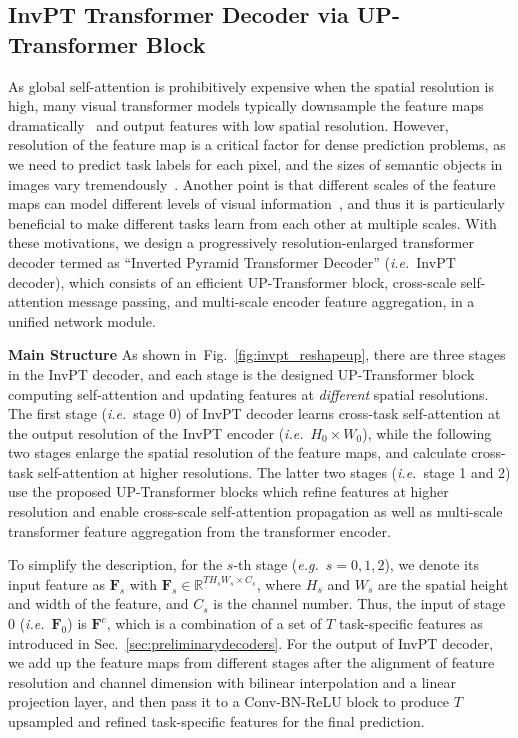 \documentclass[runningheads]{llncs}
\newcommand*{\eg}{\emph{e.g.}}
\newcommand*{\ie}{\emph{i.e.}}
\begin{document}
\subsection{InvPT Transformer Decoder via UP-Transformer Block}
\label{sec:invpt_decoder}
As global self-attention is prohibitively expensive when the spatial resolution is high, many visual transformer models typically downsample the feature maps dramatically~\cite{vit,cvt,pvt} and output features with low spatial resolution. However, resolution of the feature map is a critical factor for dense prediction problems, as we need to predict task labels for each pixel, and the sizes of semantic objects in images vary tremendously~\cite{pspnet}.
Another point is that different scales of the feature maps can model different levels of visual information~\cite{mti,hrformer}, and thus it is particularly beneficial to make different tasks learn from each other at {multiple scales}. With these motivations, we design a progressively resolution-enlarged transformer decoder termed as ``Inverted Pyramid Transformer Decoder'' (\ie~InvPT decoder), which consists of an efficient UP-Transformer block, cross-scale self-attention message passing, and multi-scale encoder feature aggregation, in a unified network module.

\vspace{3pt}
\par\noindent\textbf{Main Structure} As shown in~Fig.~\ref{fig:invpt_reshapeup}, there are three stages in the InvPT decoder, and each stage is the designed UP-Transformer block computing self-attention and updating features at \emph{different} spatial resolutions. The first stage (\ie~stage 0) of InvPT decoder learns cross-task self-attention at the output resolution of the InvPT encoder (\ie~$H_0 \times W_0$), while
the following two stages enlarge the spatial resolution of the feature maps, and calculate cross-task self-attention at higher resolutions.
The latter two stages (\ie~stage 1 and 2) use the proposed UP-Transformer blocks which refine features at higher resolution and enable cross-scale self-attention propagation as well as multi-scale transformer feature aggregation from the transformer encoder.

\par To simplify the description, for the $s$-th stage (\eg~$s=0,1,2$), we denote its input feature as $\mathbf{F}_s$ with $\mathbf{F}_s \in \mathbb{R}^{TH_s W_s  \times C_s }$, where $H_s$ and $W_s$ are the spatial height and width of the feature, and $C_s$ is the channel number. Thus, the input of stage 0 (\ie~$\mathbf{F}_0$) is $\mathbf{F}^c$, which is a combination of a set of $T$ task-specific features as introduced in Sec.~\ref{sec:preliminarydecoders}.
For the output of InvPT decoder, we add up the feature maps from different stages after the alignment of feature resolution and channel dimension with bilinear interpolation and a linear projection layer, and then pass it to a Conv-BN-ReLU block to produce $T$ upsampled and refined task-specific features for the final prediction.
\end{document}
